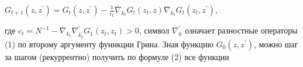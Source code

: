 \documentclass[10pt]{article}
\begin{document}
$G_{t+1}\left(z, z^{\prime}\right)=G_{t}\left(z, z^{\prime}\right)-\frac{1}{c_{t}} \nabla_{k_{t}} G_{t}\left(z_{t}, z\right) \nabla_{k_{t}} G_{t}\left(z_{t}, z^{\prime}\right)$,

где $c_{t}=N^{-1}-\nabla_{k_{t}} \nabla_{k_{t}^{\prime}}^{\prime} G_{1}\left(z_{t}, z_{t}\right)>0$, символ $\nabla_{k}^{\prime}$ означает разностные операторы (1) по второму аргументу фуннкции Грина. Зная функцию $G_{0}\left(z, z^{\prime}\right)$, можно шаг за шагом (рекуррентно) получить по формуле (2) все функции
\end{document}
